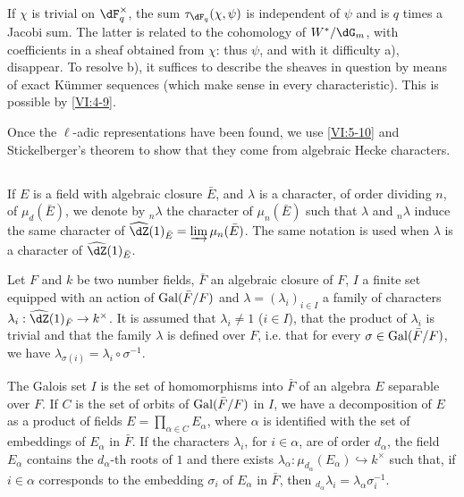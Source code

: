 If $\chi$ is trivial on $\dF_q^\times$, the sum $\tau_{\dF_q}(\chi,\psi)$ 
is independent of $\psi$ and is $q$ times a Jacobi sum. The latter is 
related to the cohomology of $W^\ast/\dG_m$, with coefficients in a sheaf 
obtained from $\chi$: thus $\psi$, and with it difficulty a), disappear. To 
resolve b), it suffices to describe the sheaves in question by means of 
exact K\"ummer sequences (which make sense in every characteristic). This is 
possible by \ref{VI:4-9}. 

Once the $\ell$-adic representations have been found, we use 
\ref{VI:5-10} and Stickelberger's theorem to show that they 
come from algebraic Hecke characters. 





\subsection{}\label{VI:6-1}

If $E$ is a field with algebraic closure $\bar E$, and $\lambda$ is 
a character, of order dividing $n$, of $\mu_d(\bar E)$, we denote by $_n\lambda$ the 
character of $\mu_n(\bar E)$ such that $\lambda$ and $_n \lambda$ induce the 
same character of $\widehat\dZ(1)_{\bar E} = \varinjlim \mu_n(\bar E)$. The 
same notation is used when $\lambda$ is a character of $\widehat\dZ(1)_{\bar E}$.

Let $F$ and $k$ be two number fields, $\bar F$ an algebraic closure of 
$F$, $I$ a finite set equipped with an action of $\operatorname{Gal}(\bar F/F)$ and 
$\lambda=(\lambda_i)_{i\in I}$ a family of characters 
$\lambda_i:\widehat\dZ(1)_{\bar F} \to k^\times$. It is assumed that 
$\lambda_i\ne 1$ ($i\in I$), that the product of $\lambda_i$ is trivial and that 
the family $\lambda$ is defined over $F$, i.e. that for every 
$\sigma\in \operatorname{Gal}(\bar F/F)$, we have 
$\lambda_{\sigma(i)}=\lambda_i\circ \sigma^{-1}$. 

The Galois set $I$ is the set of homomorphisms into $\bar F$ of an 
algebra $E$ separable over $F$. If $C$ is the set of orbits of 
$\operatorname{Gal}(\bar F/F)$ in $I$, we have a decomposition of $E$ as a product of fields 
$E=\prod_{\alpha\in C} E_\alpha$, where $\alpha$ is identified with the set of 
embeddings of $E_\alpha$ in $\bar F$. If the characters $\lambda_i$, for 
$i\in \alpha$, are of order $d_\alpha$, the field $E_\alpha$ contains the 
$d_\alpha$-th roots of $1$ and there exists 
$\lambda_\alpha:\mu_{d_\alpha}(E_\alpha) \hookrightarrow k^\times$ such that, if 
$i\in \alpha$ corresponds to the embedding $\sigma_i$ of $E_\alpha$ in $\bar F$, 
then $_{d_\alpha} \lambda_i = \lambda_\alpha \sigma_i^{-1}$. 





